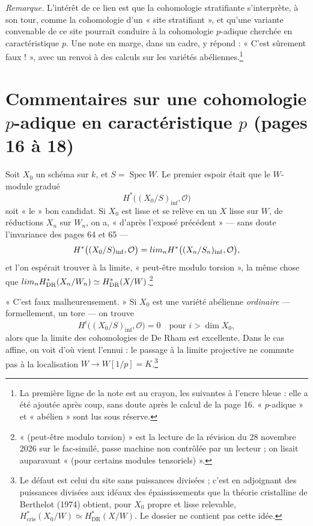 \documentclass[11pt,a4paper]{article}
\begin{document}
\emph{Remarque.} L'intérêt de ce lien est que la cohomologie stratifiante
s'interprète, à son tour, comme la cohomologie d'un « site stratifiant », et
qu'une variante convenable de ce site pourrait conduire à la cohomologie
$p$-adique cherchée en caractéristique $p$. Une note en marge, dans un cadre,
y répond : « C'est sûrement faux ! », avec un renvoi à des calculs sur les
variétés abéliennes.\footnote{La première ligne de la note est au crayon, les
suivantes à l'encre bleue : elle a été ajoutée après coup, sans doute après
le calcul de la page 16. « $p$-adique » et « abélien » sont lus sous
réserve.}

\section*{Commentaires sur une cohomologie $p$-adique en caractéristique $p$ (pages 16 à 18)}

Soit $X_0$ un schéma sur $k$, et $S = \operatorname{Spec} W$. Le premier espoir
était que le $W$-module gradué
\[
  H^{*}\bigl((X_0/S)_{\mathrm{inf}}, \mathcal{O}\bigr)
\]
soit « le » bon candidat. Si $X_0$ est lisse et se relève en un $X$ lisse sur
$W$, de réductions $X_n$ sur $W_n$, on a, « d'après l'exposé précédent » — sans doute l'invariance des pages 64
et 65 —
\[
  H^{*}\bigl((X_0/S)_{\mathrm{inf}}, \mathcal{O}\bigr) = \varprojlim_{n}
  H^{*}\bigl((X_n/S_n)_{\mathrm{inf}}, \mathcal{O}\bigr) ,
\]
et l'on espérait trouver à la limite, « peut-être modulo torsion », la même
chose que $\varprojlim_n
H^{*}_{\mathrm{DR}}(X_n/W_n) \simeq H^{*}_{\mathrm{DR}}(X/W)$.\footnote{« (peut-être
modulo torsion) » est la lecture de la révision du 28 novembre 2026 sur le
fac-similé, passe machine non contrôlée par un lecteur ; on lisait auparavant
« (pour certains modules tensoriels) ».}

« C'est faux malheureusement. » Si $X_0$ est une variété abélienne
\emph{ordinaire} — formellement, un tore — on trouve
\[
  H^{i}\bigl((X_0/S)_{\mathrm{inf}}, \mathcal{O}\bigr) = 0
  \quad \text{pour } i > \dim X_0 ,
\]
alors que la limite des cohomologies de De Rham est excellente. Dans le cas
affine, on voit d'où vient l'ennui : le passage à la limite projective ne
commute pas à la localisation $W \to W[1/p] = K$.\footnote{Le défaut est
celui du site sans puissances divisées ; c'est en adjoignant des puissances
divisées aux idéaux des épaississements que la théorie cristalline de
Berthelot (1974) obtient, pour $X_0$ propre et lisse relevable,
$H^{*}_{\mathrm{cris}}(X_0/W) \simeq H^{*}_{\mathrm{DR}}(X/W)$. Le dossier ne
contient pas cette idée.}
\end{document}

